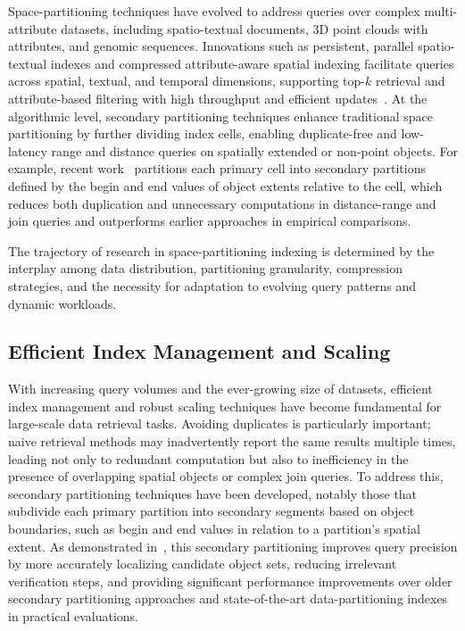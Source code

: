 \documentclass[sigconf]{acmart}
\begin{document}
Space-partitioning techniques have evolved to address queries over complex multi-attribute datasets, including spatio-textual documents, 3D point clouds with attributes, and genomic sequences. Innovations such as persistent, parallel spatio-textual indexes and compressed attribute-aware spatial indexing facilitate queries across spatial, textual, and temporal dimensions, supporting top-$k$ retrieval and attribute-based filtering with high throughput and efficient updates~\cite{ref50,ref51,ref75,ref98,ref114,ref118}. At the algorithmic level, secondary partitioning techniques enhance traditional space partitioning by further dividing index cells, enabling duplicate-free and low-latency range and distance queries on spatially extended or non-point objects. For example, recent work~\cite{ref114} partitions each primary cell into secondary partitions defined by the begin and end values of object extents relative to the cell, which reduces both duplication and unnecessary computations in distance-range and join queries and outperforms earlier approaches in empirical comparisons.

The trajectory of research in space-partitioning indexing is determined by the interplay among data distribution, partitioning granularity, compression strategies, and the necessity for adaptation to evolving query patterns and dynamic workloads.

\subsection{Efficient Index Management and Scaling}

With increasing query volumes and the ever-growing size of datasets, efficient index management and robust scaling techniques have become fundamental for large-scale data retrieval tasks. Avoiding duplicates is particularly important; naive retrieval methods may inadvertently report the same results multiple times, leading not only to redundant computation but also to inefficiency in the presence of overlapping spatial objects or complex join queries. To address this, secondary partitioning techniques have been developed, notably those that subdivide each primary partition into secondary segments based on object boundaries, such as begin and end values in relation to a partition's spatial extent. As demonstrated in~\cite{ref114}, this secondary partitioning improves query precision by more accurately localizing candidate object sets, reducing irrelevant verification steps, and providing significant performance improvements over older secondary partitioning approaches and state-of-the-art data-partitioning indexes in practical evaluations.
\end{document}
